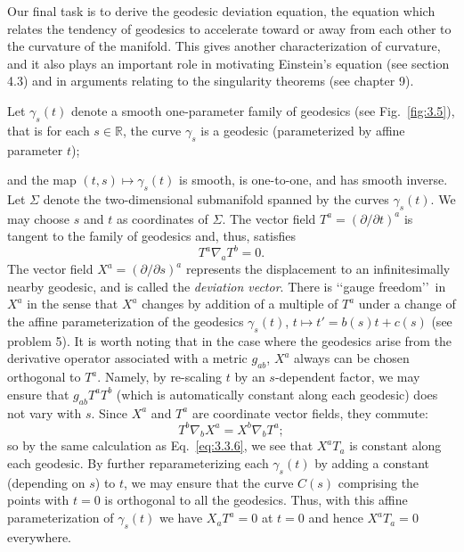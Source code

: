 Our final task is to derive the geodesic deviation equation, the equation which
relates the tendency of geodesics to accelerate toward or away from each other to the
curvature of the manifold. This gives another characterization of curvature, and it
also plays an important role in motivating Einstein's equation (see section 4.3) and
in arguments relating to the singularity theorems (see chapter 9).

Let $\gamma_s(t)$ denote a smooth one-parameter family of geodesics (see Fig.~\ref{fig:3.5}), that
is for each $s\in\mathbb R$, the curve $\gamma_s$ is a geodesic (parameterized by affine parameter $t$);



and the map $(t,s)\mapsto\gamma_s(t)$ is smooth, is one-to-one, and has smooth inverse. Let $\Sigma$
denote the two-dimensional submanifold spanned by the curves $\gamma_s(t)$. We may
choose $s$ and $t$ as coordinates of $\Sigma$. The vector field $T^a=(\partial/\partial t)^a$ is tangent to the
family of geodesics and, thus, satisfies
\begin{equation}
  T^a\nabla_aT^b=0.
  \tag{3.3.15}\label{eq:3.3.15}
\end{equation}
The vector field $X^a=(\partial/\partial s)^a$ represents the displacement to an infinitesimally
nearby geodesic, and is called the \emph{deviation vector}. There is \lq\lq gauge freedom\rq\rq\ in $X^a$
in the sense that $X^a$ changes by addition of a multiple of $T^a$ under a change of the
affine parameterization of the geodesics $\gamma_s(t)$, $t\mapsto t'=b(s)t+c(s)$ (see problem
5). It is worth noting that in the case where the geodesics arise from the derivative
operator associated with a metric $g_{ab}$, $X^a$ always can be chosen orthogonal to $T^a$.
Namely, by re-scaling $t$ by an $s$-dependent factor, we may ensure that $g_{ab}T^aT^b$
(which is automatically constant along each geodesic) does not vary with $s$. Since $X^a$
and $T^a$ are coordinate vector fields, they commute:
\begin{equation}
  T^b\nabla_bX^a=X^b\nabla_bT^a;
  \tag{3.3.16}\label{eq:3.3.16}
\end{equation}
so by the same calculation as Eq.~\eqref{eq:3.3.6}, we see that $X^aT_a$ is constant along
each geodesic. By further reparameterizing each $\gamma_s(t)$ by adding a constant (depending on $s$) to $t$, we may ensure that the curve $C(s)$ comprising the points with
$t=0$ is orthogonal to all the geodesics. Thus, with this affine parameterization of
$\gamma_s(t)$ we have $X_aT^a=0$ at $t=0$ and hence $X^aT_a=0$ everywhere.

